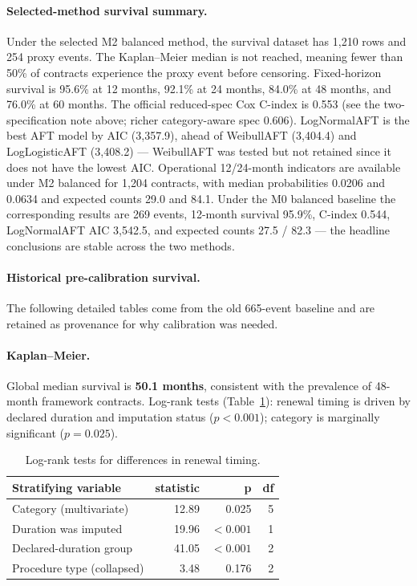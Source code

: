 \documentclass[11pt,a4paper]{article}
\begin{document}
\paragraph{Selected-method survival summary.}
Under the selected M2 balanced method, the survival dataset has 1{,}210 rows
and 254 proxy events. The Kaplan--Meier median is not reached, meaning fewer
than 50\% of contracts experience the proxy event before censoring.
Fixed-horizon survival is 95.6\% at 12 months, 92.1\% at 24 months, 84.0\% at
48 months, and 76.0\% at 60 months. The official reduced-spec Cox C-index is
0.553 (see the two-specification note above; richer category-aware spec
0.606). LogNormalAFT is the best AFT model by AIC (3{,}357.9), ahead of
WeibullAFT (3{,}404.4) and LogLogisticAFT (3{,}408.2) --- WeibullAFT was
tested but not retained since it does not have the lowest AIC. Operational
12/24-month indicators are available under M2 balanced for 1{,}204 contracts,
with median probabilities 0.0206 and 0.0634 and expected counts 29.0 and 84.1.
Under the M0 balanced baseline the corresponding results are 269 events,
12-month survival 95.9\%, C-index 0.544, LogNormalAFT AIC 3{,}542.5, and
expected counts 27.5 / 82.3 --- the headline conclusions are stable across the
two methods.

\paragraph{Historical pre-calibration survival.} The following detailed tables
come from the old 665-event baseline and are retained as provenance for why
calibration was needed.

\paragraph{Kaplan--Meier.} Global median survival is \textbf{50.1 months},
consistent with the prevalence of 48-month framework contracts. Log-rank tests
(Table~\ref{tab:logrank}): renewal timing is driven by declared duration and
imputation status ($p<0.001$); category is marginally significant ($p=0.025$).

\begin{table}[H]
\centering
\caption{Log-rank tests for differences in renewal timing.}
\label{tab:logrank}
\small
\begin{tabular}{@{}lrrr@{}}
\toprule
\textbf{Stratifying variable} & \textbf{statistic} & \textbf{p} & \textbf{df} \\
\midrule
Category (multivariate)        & 12.89 & 0.025 & 5 \\
Duration was imputed           & 19.96 & $<0.001$ & 1 \\
Declared-duration group        & 41.05 & $<0.001$ & 2 \\
Procedure type (collapsed)     &  3.48 & 0.176 & 2 \\
\bottomrule
\end{tabular}
\end{table}
\end{document}
